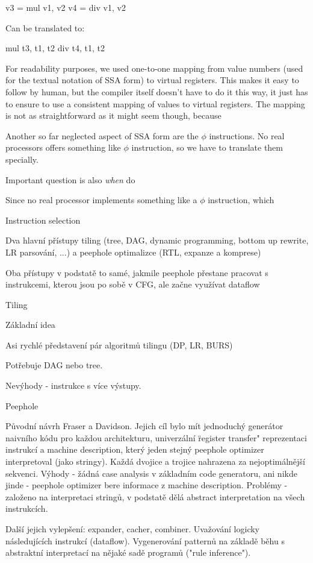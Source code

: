 \begtt
v3 = mul v1, v2
v4 = div v1, v2
\endtt

Can be translated to:

\begtt
mul t3, t1, t2
div t4, t1, t2
\endtt

For readability purposes, we used one-to-one mapping from value numbers (used
for the textual notation of SSA form) to virtual registers. This makes it easy
to follow by human, but the compiler itself doesn't have to do it this way, it
just has to ensure to use a consistent mapping of values to virtual registers.
The mapping is not as straightforward as it might seem though, because 

Another so far neglected aspect of SSA form are the $\phi$ instructions. No real
processors offers something like $\phi$ instruction, so we have to translate
them specially.

Important question is also {\em when} do 


Since no real processor implements something like a $\phi$ instruction, which 

\sec Instruction selection

Dva hlavní přístupy tiling (tree, DAG, dynamic programming, bottom up rewrite,
LR parsování, ...) a peephole optimalizce (RTL, expanze a komprese)

Oba přístupy v podstatě to samé, jakmile peephole přestane pracovat s
instrukcemi, kterou jsou po sobě v CFG, ale začne využívat dataflow

\secc Tiling

Základní idea

Asi rychlé představení pár algoritmů tilingu (DP, LR, BURS)

Potřebuje DAG nebo tree.

Nevýhody - instrukce s více výstupy.

\secc Peephole

Původní návrh Fraser a Davidson. Jejich cíl bylo mít jednoduchý generátor
naivního kódu pro každou architekturu, univerzální \"register transfer"
reprezentaci instrukcí a machine description, který jeden stejný peephole
optimizer interpretoval (jako stringy). Každá dvojice a trojice nahrazena za
nejoptimálnější sekvenci. Výhody - žádná case analysis v základním code
generatoru, ani nikde jinde - peephole optimizer bere informace z machine
description. Problémy - založeno na interpretaci stringů, v podstatě dělá
abstract interpretation na všech instrukcích.

Další jejich vylepšení: expander, cacher, combiner. Uvažování logicky
následujících instrukcí (dataflow). Vygenerování patternů na
základě běhu s abstraktní interpretací na nějaké sadě programů ("rule
inference").

